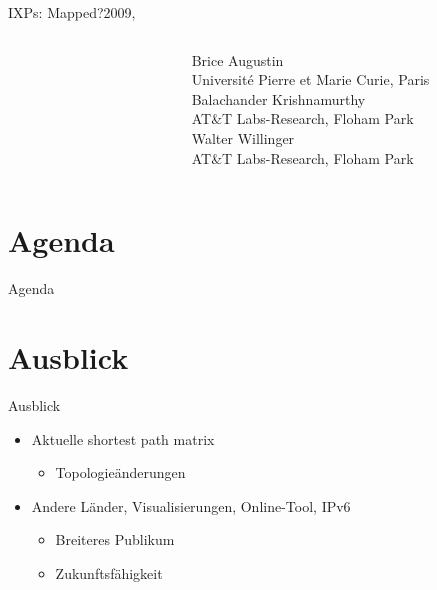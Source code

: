 \documentclass[ngerman,compress,hyperref={bookmarks}]{beamer}
\begin{document}
\begin{frame}{IXPs: Mapped?}{2009, \cite{Augustin:2009:IM:1644893.1644934}}
\begin{columns}[c]
\begin{column}{0.1\textwidth}
\begin{figure}
      \end{figure}
    \end{column}
    \begin{column}{0.3\textwidth}
      {\scriptsize Brice Augustin\\
      \vspace{0.1cm}
      Université Pierre et Marie Curie, Paris\\
      \vspace{0.5cm}
      Balachander Krishnamurthy\\
      \vspace{0.1cm}
      AT\&T Labs-Research, Floham Park\\
      \vspace{0.3cm}
      Walter Willinger\\
      \vspace{0.1cm}
      AT\&T Labs-Research, Floham Park\\ }
    \end{column}
  \end{columns}
\end{frame}

\section*{Agenda}
\begin{frame}{Agenda} \setcounter{tocdepth}{1} \tableofcontents[part=1] \setcounter{tocdepth}{3} \end{frame}

\section{Ausblick}
\begin{frame}{Ausblick}
\begin{itemize}
 \item Aktuelle shortest path matrix
 \begin{itemize}
  \item Topologieänderungen
 \end{itemize}\vspace{1cm}
 \item Andere Länder, Visualisierungen, Online-Tool, IPv6
 \begin{itemize}
  \item Breiteres Publikum
  \item Zukunftsfähigkeit
 \end{itemize}
\end{itemize}
\end{frame}
\end{document}
